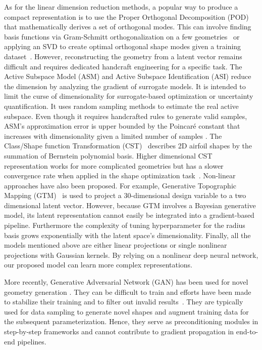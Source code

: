 As for the linear dimension reduction methods, a popular way to produce a compact representation is to use the Proper Orthogonal Decomposition (POD) that mathematically derives a set of orthogonal modes. This can involve finding basis functions via Gram-Schmitt orthogonalization on a few geometries~\cite{aa.Robinson2001} or applying an SVD to create optimal orthogonal shape modes given a training dataset~\cite{aa.Poole2015,aa.Masters2017,aa.Li2019b,aa.Kedward2020}. However, reconstructing the geometry from a latent vector remains difficult and requires dedicated handcraft engineering for a specific task. The Active Subspace Model (ASM) \cite{aa.Constantine2014,aa.Li2019,aa.Lukaczyk2014,aa.Namura2017,aa.Grey2018} and Active Subspace Identification (ASI)\cite{aa.Bauerheim2016} reduce the dimension by analyzing the gradient of surrogate models. It is intended to limit the curse of dimensionality \cite{ai.Bellman1961} for surrogate-based optimization or uncertainty quantification. It uses random sampling methods to estimate  the real active subspace. Even though it requires handcrafted rules to generate valid samples, ASM's approximation error is upper bounded by the Poincaré constant that increases with dimensionality given a limited number of samples \cite{ai.Payne1960,ai.Beyer1999}. The Class/Shape function Transformation (CST)~\cite{aa.Kulfan2008} describes 2D airfoil shapes by the summation of Bernstein polynomial basis. Higher dimensional CST representation works for more complicated geometries but has a slower convergence rate when applied in the shape optimization task~\cite{aa.Ceze2009}. Non-linear approaches have also been proposed. For example, Generative Topographic Mapping (GTM)~\cite{aa.Viswanath2011} is used to  project a 30-dimensional design variable to a two dimensional latent vector. However, because GTM involves a Bayesian generative model, its latent representation cannot easily be integrated into a gradient-based pipeline. Furthermore the complexity of tuning hyperparameter for the radius basis grows exponentially with the latent space's dimensionality. Finally, all the models mentioned above are either linear projections or single nonlinear projections with Gaussian kernels.  By relying on a nonlinear deep neural network, our proposed model can learn more complex representations.

More recently, Generative Adversarial Network (GAN) has been used for novel geometry generation \cite{aa.Achour2020,aa.Du2020,aa.Chen2020}. They can be difficult to train and efforts have been made to stabilize their training and to filter out invalid results~\cite{aa.Li2020,aa.Li2021}. They are typically used for data sampling to generate novel shapes and augment training data for the subsequent parameterization. Hence, they serve as preconditioning modules in step-by-step frameworks and cannot contribute to gradient propagation in end-to-end pipelines. 

